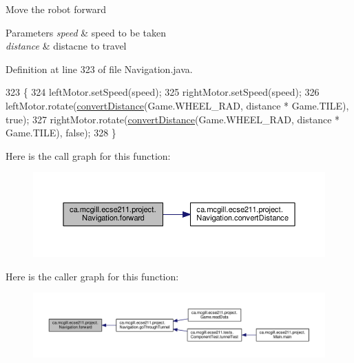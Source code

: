 Move the robot forward 
\begin{DoxyParams}{Parameters}
{\em speed} & speed to be taken \\
\hline
{\em distance} & distacne to travel \\
\hline
\end{DoxyParams}


Definition at line 323 of file Navigation.\+java.


\begin{DoxyCode}
323                                                   \{
324     leftMotor.setSpeed(speed);
325     rightMotor.setSpeed(speed);
326     leftMotor.rotate(\hyperlink{classca_1_1mcgill_1_1ecse211_1_1project_1_1_navigation_ac9e260bcd619ffa4820d7d0de7ea1c12}{convertDistance}(Game.WHEEL\_RAD, distance * Game.TILE), \textcolor{keyword}{true});
327     rightMotor.rotate(\hyperlink{classca_1_1mcgill_1_1ecse211_1_1project_1_1_navigation_ac9e260bcd619ffa4820d7d0de7ea1c12}{convertDistance}(Game.WHEEL\_RAD, distance * Game.TILE), \textcolor{keyword}{false});
328   \}
\end{DoxyCode}
Here is the call graph for this function\+:
\nopagebreak
\begin{figure}[H]
\begin{center}
\leavevmode
\includegraphics[width=350pt]{classca_1_1mcgill_1_1ecse211_1_1project_1_1_navigation_a7c66610c5b7496ddb35d342ab2cd3f08_cgraph}
\end{center}
\end{figure}
Here is the caller graph for this function\+:
\nopagebreak
\begin{figure}[H]
\begin{center}
\leavevmode
\includegraphics[width=350pt]{classca_1_1mcgill_1_1ecse211_1_1project_1_1_navigation_a7c66610c5b7496ddb35d342ab2cd3f08_icgraph}
\end{center}
\end{figure}
\mbox{\label{classca_1_1mcgill_1_1ecse211_1_1project_1_1_navigation_a4b52e605d3ea2f9bcd9481ae2c69ba39}} 
